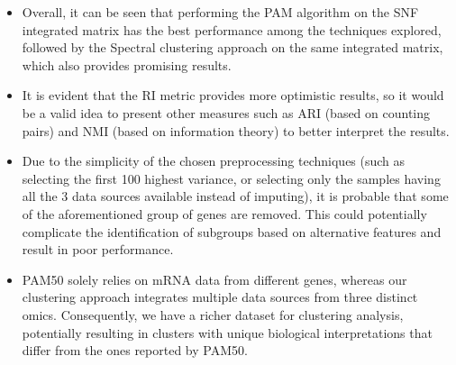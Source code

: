 \begin{itemize}[]
    \item Overall, it can be seen that performing the PAM algorithm on the SNF integrated matrix has the best performance among the techniques explored, followed by the Spectral clustering approach on the same integrated matrix, which also provides promising results.
    \item It is evident that the RI metric provides more optimistic results, so it would be a valid idea to present other measures such as ARI (based on counting pairs) and NMI (based on information theory) to better interpret the results.
    \item Due to the simplicity of the chosen preprocessing techniques (such as selecting the first 100 highest variance, or selecting only the samples having all the 3 data sources available instead of imputing), it is probable that some of the aforementioned group of genes are removed. This could potentially complicate the identification of subgroups based on alternative features and result in poor performance.
    \item PAM50 solely relies on mRNA data from different genes, whereas our clustering approach integrates multiple data sources from three distinct omics. Consequently, we have a richer dataset for clustering analysis, potentially resulting in clusters with unique biological interpretations that differ from the ones reported by PAM50.
\end{itemize}

